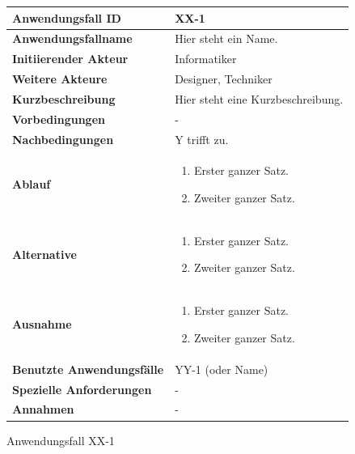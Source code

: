 \newpage

\begin{figure}[h]
	\centering
	\begin{tabularx}{\textwidth}{ X | X }
		\textbf{Anwendungsfall ID} & XX-1 \\ \hline
		\textbf{Anwendungsfallname} & Hier steht ein Name. \\ \hline
		\textbf{Initiierender Akteur} & Informatiker \\ \hline
		\textbf{Weitere Akteure} & Designer, Techniker  \\ \hline
		\textbf{Kurzbeschreibung} & Hier steht eine Kurzbeschreibung.  \\ \hline
		\textbf{Vorbedingungen} & -  \\ \hline
		\textbf{Nachbedingungen} & Y trifft zu.  \\ \hline
		\textbf{Ablauf} &
		\begin{enumerate}
			\item Erster ganzer Satz.
			\item Zweiter ganzer Satz.
		\end{enumerate} \\ \hline
		\textbf{Alternative} &
		\begin{enumerate}
			\item Erster ganzer Satz.
			\item Zweiter ganzer Satz.
		\end{enumerate}  \\ \hline
		\textbf{Ausnahme} &
		\begin{enumerate}
			\item Erster ganzer Satz.
			\item Zweiter ganzer Satz.
		\end{enumerate}  \\ \hline
		\textbf{Benutzte Anwendungsfälle} & YY-1 (oder Name) \\ \hline
		\textbf{Spezielle Anforderungen} & - \\ \hline
		\textbf{Annahmen} & -
	\end{tabularx}
	\caption{Anwendungsfall XX-1}
	\label{fig:anwendungsfall-server-tabelle-xx-1}
\end{figure}